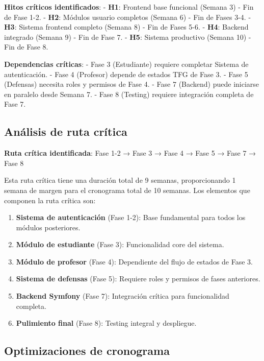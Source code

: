 \documentclass[12pt,a4paper,oneside]{report}
\providecommand{\tightlist}{%
  \setlength{\itemsep}{0pt}\setlength{\parskip}{0pt}}
\begin{document}
\textbf{Hitos críticos identificados}: - \textbf{H1}: Frontend base
funcional (Semana 3) - Fin de Fase 1-2. - \textbf{H2}: Módulos usuario
completos (Semana 6) - Fin de Fases 3-4. - \textbf{H3}: Sistema frontend
completo (Semana 8) - Fin de Fases 5-6. - \textbf{H4}: Backend integrado
(Semana 9) - Fin de Fase 7. - \textbf{H5}: Sistema productivo (Semana
10) - Fin de Fase 8.

\textbf{Dependencias críticas}: - Fase 3 (Estudiante) requiere completar
Sistema de autenticación. - Fase 4 (Profesor) depende de estados TFG de
Fase 3. - Fase 5 (Defensas) necesita roles y permisos de Fase 4. - Fase
7 (Backend) puede iniciarse en paralelo desde Semana 7. - Fase 8
(Testing) requiere integración completa de Fase 7.

\subsection{Análisis de ruta
crítica}\label{anuxe1lisis-de-ruta-cruxedtica}

\textbf{Ruta crítica identificada}: Fase 1-2 → Fase 3 → Fase 4 → Fase 5
→ Fase 7 → Fase 8

Esta ruta crítica tiene una duración total de 9 semanas, proporcionando
1 semana de margen para el cronograma total de 10 semanas. Los elementos
que componen la ruta crítica son:

\begin{enumerate}
\def\labelenumi{\arabic{enumi}.}
\tightlist
\item
  \textbf{Sistema de autenticación} (Fase 1-2): Base fundamental para
  todos los módulos posteriores.
\item
  \textbf{Módulo de estudiante} (Fase 3): Funcionalidad core del
  sistema.
\item
  \textbf{Módulo de profesor} (Fase 4): Dependiente del flujo de estados
  de Fase 3.
\item
  \textbf{Sistema de defensas} (Fase 5): Requiere roles y permisos de
  fases anteriores.
\item
  \textbf{Backend Symfony} (Fase 7): Integración crítica para
  funcionalidad completa.
\item
  \textbf{Pulimiento final} (Fase 8): Testing integral y despliegue.
\end{enumerate}

\subsection{Optimizaciones de
cronograma}\label{optimizaciones-de-cronograma}
\end{document}
